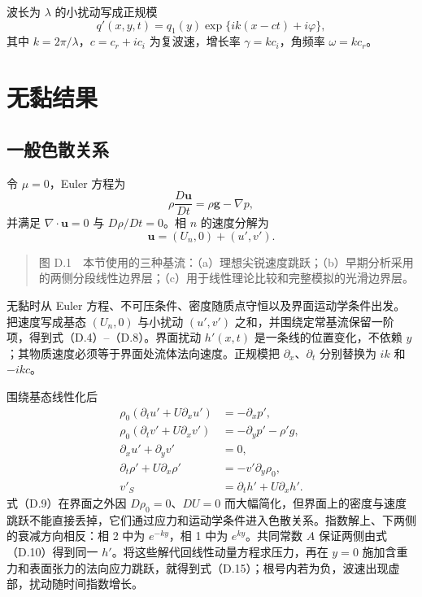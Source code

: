 \documentclass[11pt,a4paper,openany,fontset=none]{ctexbook}
\begin{document}
波长为 $\lambda$ 的小扰动写成正规模
\begin{equation}
 q'(x,y,t)=q_1(y)\exp\{ik(x-ct)+i\varphi\}, \tag{D.1}
\end{equation}
其中 $k=2\pi/\lambda$，$c=c_r+ic_i$ 为复波速，增长率 $\gamma=kc_i$，角频率 $\omega=kc_r$。

\section{无黏结果}

\subsection{一般色散关系}

令 $\mu=0$，Euler 方程为
\begin{equation}
 \rho\frac{D\bm u}{Dt}=\rho\bm g-\nabla p, \tag{D.2}
\end{equation}
并满足 $\nabla\cdot\bm u=0$ 与 $D\rho/Dt=0$。相 $n$ 的速度分解为
\begin{equation}
 \bm u=(U_n,0)+(u',v'). \tag{D.3}
\end{equation}
\begin{quote}\small 图 D.1　本节使用的三种基流：（a）理想尖锐速度跳跃；（b）早期分析采用的两侧分段线性边界层；（c）用于线性理论比较和完整模拟的光滑边界层。\end{quote}
无黏时从 Euler 方程、不可压条件、密度随质点守恒以及界面运动学条件出发。把速度写成基态 $(U_n,0)$ 与小扰动 $(u',v')$ 之和，并围绕定常基流保留一阶项，得到式（D.4）--（D.8）。界面扰动 $h'(x,t)$ 是一条线的位置变化，不依赖 $y$；其物质速度必须等于界面处流体法向速度。正规模把 $\partial_x$、$\partial_t$ 分别替换为 $ik$ 和 $-ikc$。

围绕基态线性化后
\begin{align}
 \rho_0(\partial_tu'+U\partial_xu')&=-\partial_xp', \tag{D.4}\\
 \rho_0(\partial_tv'+U\partial_xv')&=-\partial_yp'-\rho'g, \tag{D.5}\\
 \partial_xu'+\partial_yv'&=0, \tag{D.6}\\
 \partial_t\rho'+U\partial_x\rho'&=-v'\partial_y\rho_0, \tag{D.7}\\
 v'_S&=\partial_th'+U\partial_xh'. \tag{D.8}
\end{align}
式（D.9）在界面之外因 $D\rho_0=0$、$DU=0$ 而大幅简化，但界面上的密度与速度跳跃不能直接丢掉，它们通过应力和运动学条件进入色散关系。指数解上、下两侧的衰减方向相反：相 2 中为 $e^{-ky}$，相 1 中为 $e^{ky}$。共同常数 $A$ 保证两侧由式（D.10）得到同一 $h'$。将这些解代回线性动量方程求压力，再在 $y=0$ 施加含重力和表面张力的法向应力跳跃，就得到式（D.15）；根号内若为负，波速出现虚部，扰动随时间指数增长。
\end{document}
